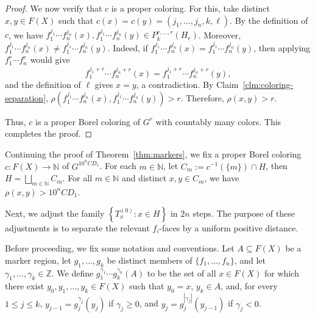 \documentclass[11pt, reqno, a4paper]{amsart}
\theoremstyle{definition}
\theoremstyle{plain}
\begin{document}
\begin{proof}
We now verify that $c$ is a proper coloring. For this, take distinct $x,y\in F(X)$ such that
$c(x)=c(y)=(j_1,\ldots,j_n,k,\ell)$.
By the definition of $c$, we have
$f_1^{j_1}\cdots f_n^{j_n}(x),f_1^{j_1}\cdots f_n^{j_n}(y)\in P_k^{r,\ldots,r}(H_r)$.
Moreover, $f_1^{j_1}\cdots f_n^{j_n}(x)\ne f_1^{j_1}\cdots f_n^{j_n}(y)$. Indeed, if $f_1^{j_1}\cdots f_n^{j_n}(x)=f_1^{j_1}\cdots f_n^{j_n}(y)$, then applying
$f_1^r\cdots f_n^r$ would give
$$
f_1^{j_1+r}\cdots f_n^{j_n+r}(x)
=
f_1^{j_1+r}\cdots f_n^{j_n+r}(y),
$$
and the definition of $\ell$ gives $x=y$,
a contradiction. By Claim~\ref{clm:coloring-separation},
$\rho(f_1^{j_1}\cdots f_n^{j_n}(x),f_1^{j_1}\cdots f_n^{j_n}(y))>r$.
Therefore,
$\rho(x,y)>r$.

Thus, $c$ is a proper Borel coloring of $G^r$ with countably many colors. This completes the proof.
\end{proof}

Continuing the proof of Theorem~\ref{thm:markers}, we fix a proper Borel coloring $c\colon F(X)\to\mathbb{N}$ of $G^{10^nCD_1}$.
For each $m\in \mathbb{N}$, let
$C_m:=c^{-1}(\{m\})\cap H$, then
$H=\bigsqcup_{m\in \mathbb{N}} C_m$.  For all $m\in \mathbb{N}$ and distinct $x,y \in C_m$, we have 
$\rho(x,y) > 10^nCD_1$.


Next, we adjust the family $\left\{T_x^{(0)} : x \in H\right\}$ in $2n$ steps.
The purpose of these adjustments is to separate the relevant $f_i$-faces by a uniform positive distance. 


Before proceeding, we fix some notation and conventions. Let $A\subseteq F(X)$ be a marker region, let
$g_1,\ldots,g_k$ be distinct members of
$\{f_1,\ldots,f_n\}$, and let
$\gamma_1,\ldots,\gamma_k\in\mathbb Z$. We define $g_1^{\gamma_1}\cdots g_k^{\gamma_k}(A)$ to be the set of all $x\in F(X)$ for which there exist
$y_0,y_1,\ldots,y_k\in F(X)$ such that
$y_0=x$, $y_k\in A$, and, for every $1\le j\le k$,
$y_{j-1}=g_j^{\gamma_j}(y_j)$ if $\gamma_j\ge0$,
and
$y_j=g_j^{|\gamma_j|}(y_{j-1})$ if $\gamma_j<0$.
\end{document}
